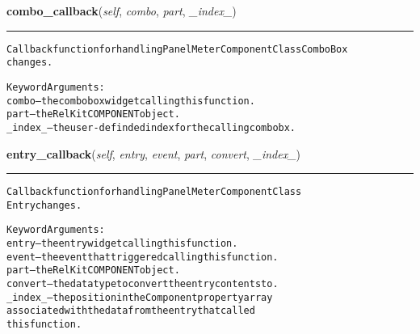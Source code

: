     \vspace{0.5ex}

\hspace{.8\funcindent}\begin{boxedminipage}{\funcwidth}

    \raggedright \textbf{combo\_callback}(\textit{self}, \textit{combo}, \textit{part}, \textit{\_index\_})

    \vspace{-1.5ex}

    \rule{\textwidth}{0.5\fboxrule}
\setlength{\parskip}{2ex}
\begin{alltt}
Callback function for handling Panel Meter Component Class ComboBox
changes.

Keyword Arguments:
  combo -- the combobox widget calling this function.
   part -- the RelKit COMPONENT object.
\_index\_ -- the user-definded index for the calling combobx.
\end{alltt}

\setlength{\parskip}{1ex}
    \end{boxedminipage}

    \label{reliafree:meters:meter:Panel:entry_callback}

    \vspace{0.5ex}

\hspace{.8\funcindent}\begin{boxedminipage}{\funcwidth}

    \raggedright \textbf{entry\_callback}(\textit{self}, \textit{entry}, \textit{event}, \textit{part}, \textit{convert}, \textit{\_index\_})

    \vspace{-1.5ex}

    \rule{\textwidth}{0.5\fboxrule}
\setlength{\parskip}{2ex}
\begin{alltt}
Callback function for handling Panel Meter Component Class
Entry changes.

Keyword Arguments:
  entry -- the entry widget calling this function.
  event -- the event that triggered calling this function.
   part -- the RelKit COMPONENT object.
convert -- the data type to convert the entry contents to.
\_index\_ -- the position in the Component property array
           associated with the data from the entry that called
           this function.
\end{alltt}

\setlength{\parskip}{1ex}
    \end{boxedminipage}

